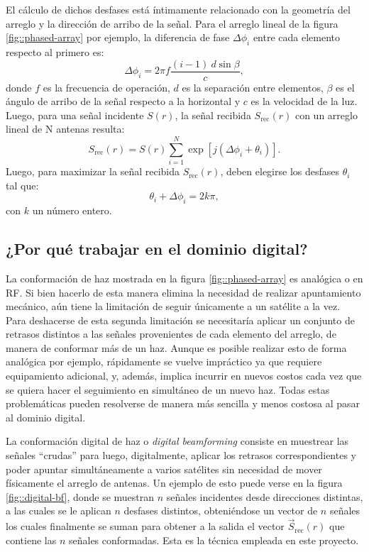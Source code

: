 \documentclass[../../main.tex]{subfiles}
\begin{document}
El cálculo de dichos desfases está íntimamente relacionado con la geometría del arreglo y la dirección de arribo de la señal. Para el arreglo lineal de la figura \ref{fig::phased-array} por ejemplo, la diferencia de fase $\Delta \phi_i$ entre cada elemento respecto al primero es:
\begin{equation}
    \Delta \phi_i = 2 \pi f \frac{(i - 1) \ d \sin{\beta}}{c},
\end{equation} 
donde $f$ es la frecuencia de operación, $d$ es la separación entre elementos, $\beta$ es el ángulo de arribo de la señal respecto a la horizontal y $c$ es la velocidad de la luz. Luego, para una señal incidente $S(r)$, la señal recibida $S_{\textrm{rec}}(r)$ con un arreglo lineal de N antenas resulta:
\begin{equation}
    S_{\textrm{rec}}(r) = S(r) \sum_{i=1}^{N} \exp[{j (\Delta \phi_i + \theta_i)}].
\end{equation}
Luego, para maximizar la señal recibida $S_{\textrm{rec}}(r)$, deben elegirse los desfases $\theta_i$ tal que:
\begin{equation}
    \theta_i + \Delta \phi_i = 2 k \pi,
\end{equation}
con $k$ un número entero.


\subsection{¿Por qué trabajar en el dominio digital?}

La conformación de haz mostrada en la figura \ref{fig::phased-array} es analógica o en RF. Si bien hacerlo de esta manera elimina la necesidad de realizar apuntamiento mecánico, aún tiene la limitación de seguir únicamente a un satélite a la vez. Para deshacerse de esta segunda limitación se necesitaría aplicar un conjunto de retrasos distintos a las señales provenientes de cada elemento del arreglo, de manera de conformar más de un haz.
Aunque es posible realizar esto de forma analógica por ejemplo, rápidamente se vuelve impráctico ya que requiere equipamiento adicional, y, además, implica incurrir en nuevos costos cada vez que se quiera hacer el seguimiento en simultáneo de un nuevo haz.
Todas estas problemáticas pueden resolverse de manera más sencilla y menos costosa al pasar al dominio digital. 

La conformación digital de haz o \textit{digital beamforming} consiste en muestrear las señales ``crudas'' para luego, digitalmente, aplicar los retrasos correspondientes y poder apuntar simultáneamente a varios satélites sin necesidad de mover físicamente el arreglo de antenas. Un ejemplo de esto puede verse en la figura \ref{fig::digital-bf}, donde se muestran $n$ señales incidentes desde direcciones distintas, a las cuales se le aplican $n$ desfases distintos, obteniéndose un vector de $n$ señales los cuales finalmente se suman para obtener a la salida el vector $\vec{S}_{\textrm{rec}}(r)$ que contiene las $n$ señales conformadas. Esta es la técnica empleada en este proyecto.
\end{document}
